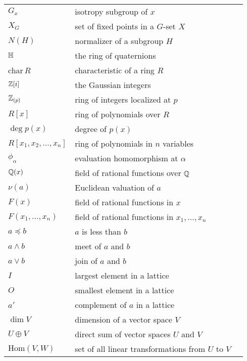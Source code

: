 \begin{center}
\begin{longtable}{llr}
%
$G_x$ & isotropy subgroup of $x$ & \pageref{noteisotropy} \\
%
$X_G$ & set of fixed points in a $G$-set $X$ & \pageref{noteXG} \\
%
$N(H)$ & normalizer of a subgroup $H$ & \pageref{notenormalizer} \\
%
${\Bbb H}$ & the ring of quaternions & \pageref{noteringH} \\
%
\mbox{char$\, R$} & characteristic of a ring $R$ & \pageref{ringchar} \\
%
${\Bbb Z}[i ]$ & the Gaussian integers & \pageref{gaussianintegers} \\
%
${\Bbb Z}_{(p)}$ & ring of integers localized at $p$ & \pageref{notelocalint} \\
%
$R[x]$ & ring of polynomials over $R$ & \pageref{polynomialring} \\
%
$\deg p(x)$ & degree of $p(x)$ & \pageref{polydegree} \\
%
$R[x_1, x_2, \ldots, x_n]$ & ring of polynomials in $n$ variables & \pageref{notepolynvar} \\
%
$\phi_{\alpha}$ & evaluation homomorphism at $\alpha$ & \pageref{noteevalhomo} \\
%
${\Bbb Q}(x)$ & field of rational functions over ${\Bbb Q}$ & \pageref{noteratpoly} \\
%
$\nu(a)$ & Euclidean valuation of $a$ & \pageref{notevaluation} \\
%
$F(x)$ & field of rational functions in $x$ & \pageref{noteratfun} \\
%
$F(x_1, \ldots, x_n)$ & field of rational functions in $x_1, \ldots, x_n$ & \pageref{noteratnvar} \\
%
$a \preceq b$ &  $a$ is less than $b$ & \pageref{lessthan} \\
%
$a \wedge b$ & meet of $a$ and $b$ & \pageref{meet} \\
%
$a \vee b$ & join of $a$ and $b$ & \pageref{join} \\
%
$I$ & largest element in a lattice & \pageref{notelargeposet} \\
%
$O$ & smallest element in a lattice & \pageref{notesmallposet} \\
%
$a'$ & complement of $a$ in a lattice &\pageref{notedlatticecomp}  \\
%
$\dim V$ & dimension of a vector space $V$ & \pageref{vectdim} \\
%
$U \oplus V$ & direct sum of vector spaces $U$ and $V$ & \pageref{notedirectsum} \\
%
$\mbox{Hom}(V, W)$ & set of all linear transformations from $U$ to $V$ & \pageref{noteHom} \\

\end{longtable}
\end{center}
